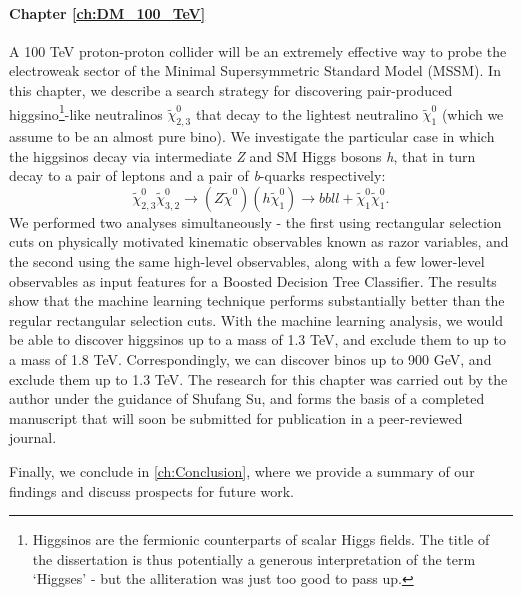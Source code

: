 \paragraph{Chapter \ref{ch:DM_100_TeV}}
A 100 TeV proton-proton collider will be an extremely effective way to probe the electroweak sector of the Minimal Supersymmetric Standard Model (MSSM). In this chapter, we describe a search strategy for discovering pair-produced higgsino\footnote{Higgsinos are the fermionic counterparts of scalar Higgs fields. The title of the dissertation is thus potentially a generous interpretation of the term `Higgses' - but the alliteration was just too good to pass up.}-like neutralinos $\tilde{\chi}_{2,3}^0$ that decay to the lightest neutralino $\tilde{\chi}_1^0$ (which we assume to be an almost pure bino). We investigate the particular case in which the higgsinos decay via intermediate \emph{Z} and SM Higgs bosons \emph{h}, that in turn decay to a pair of leptons and a pair of \emph{b}-quarks respectively: 
$$\tilde{\chi}^0_{2,3}\tilde{\chi}^0_{3,2}\rightarrow (Z\tilde{\chi}^0)(h\tilde{\chi}_1^0)\rightarrow bbll+\tilde{\chi}_1^0\tilde{\chi}_1^0.$$
We performed two analyses simultaneously - the first using rectangular selection cuts on physically motivated kinematic observables known as razor variables, and the second using the same high-level observables, along with a few lower-level observables as input features for a Boosted Decision Tree Classifier. The results show that the machine learning technique performs substantially better than the regular rectangular selection cuts. With the machine learning analysis, we would be able to discover higgsinos up to a mass of 1.3 TeV, and exclude them to up to a mass of 1.8 TeV. Correspondingly, we can discover binos up to 900 GeV, and exclude them up to 1.3 TeV. The research for this chapter was carried out by the author under the guidance of Shufang Su, and forms the basis of a completed manuscript that will soon be submitted for publication in a peer-reviewed journal.

Finally, we conclude in \autoref{ch:Conclusion}, where we provide a summary of our findings and discuss prospects for future work.

